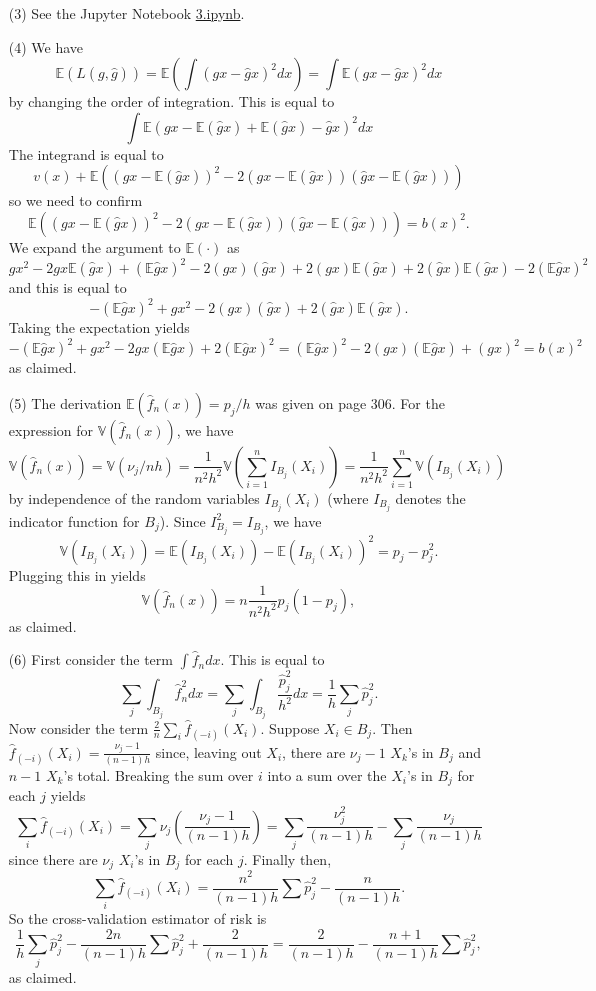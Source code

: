 \documentclass[10pt]{article}
\newcommand{\V}{\mathbb{V}}
\newcommand{\E}{\mathbb{E}}
\begin{document}
\begin{enumerate}
\item[(3)]
See the Jupyter Notebook
\href{https://github.com/ajrasmus/some_of_statistics/blob/main/chapter_20/3.ipynb}{3.ipynb}.

\item[(4)]
We have
\[
\E(L(g,\hat g)) = \E\left(\int (gx - \hat gx)^2dx\right) =
\int \E(gx - \hat gx)^2 dx
\]
by changing the order of integration. This is equal to
\[
\int \E(gx - \E(\hat gx) + \E(\hat gx) - \hat gx)^2 dx
\]
The integrand is equal to
\[
v(x) + \E((gx - \E(\hat gx))^2  - 2(gx-\E(\hat gx))(\hat gx - \E(\hat gx)))
\]
so we need to confirm
\[
\E((gx - \E(\hat gx))^2  - 2(gx-\E(\hat gx))(\hat gx - \E(\hat gx))) = b(x)^2.
\]
We expand the argument to $\E(\cdot)$ as
\[
gx^2 - 2gx\E(\hat gx) + (\E\hat gx)^2 - 2(gx)(\hat gx) + 2(gx)\E(\hat gx) +
2(\hat gx)\E(\hat gx) - 2 (\E\hat gx)^2
\]
and this is equal to
\[
- (\E \hat gx)^2 + gx^2 - 2(gx)(\hat gx) + 2(\hat gx)\E(\hat gx).
\]
Taking the expectation yields
\[
-(\E \hat gx)^2 + gx^2 - 2 gx(\E \hat gx) + 2(\E\hat gx)^2
= (\E \hat gx)^2 - 2(gx)(\E\hat gx) + (gx)^2 = b(x)^2
\]
as claimed.

\item[(5)]
The derivation $\E(\hat f_n(x))=p_j/h$ was given on page 306. For the expression for
$\V(\hat f_n(x))$, we have
\[
\V(\hat f_n(x))=\V(\nu_j/{nh})=\frac{1}{n^2h^2}\V\left(\sum_{i=1}^n I_{B_j}(X_i)\right)=
\frac{1}{n^2h^2}\sum_{i=1}^n \V(I_{B_j}(X_i))
\]
by independence of the random variables $I_{B_j}(X_i)$ (where $I_{B_j}$ denotes
the indicator function for $B_j$). Since $I_{B_j}^2 = I_{B_j}$, we have
\[
\V(I_{B_j}(X_i)) = \E(I_{B_j}(X_i)) - \E(I_{B_j}(X_i))^2 = p_j - p_j^2.
\]
Plugging this in yields
\[
\V(\hat f_n(x)) = n \frac{1}{n^2h^2} p_j(1-p_j),
\]
as claimed.

\item[(6)]
First consider the term $\int \hat f_n dx$. This is equal to
\[
\sum_j \int_{B_j} \hat f_n^2 dx = \sum_j \int_{B_j} \frac{\hat p_j^2}{h^2}dx
= \frac{1}{h} \sum_j \hat p_j^2.
\]
Now consider the term $\frac{2}{n}\sum_i \hat f_{(-i)}(X_i)$. Suppose
$X_i\in B_j$. Then $\hat f_{(-i)}(X_i)=\frac{\nu_j-1}{(n-1)h}$ since,
leaving out $X_i$, there are $\nu_j-1$ $X_k$'s in $B_j$ and $n-1$ $X_k$'s total.
Breaking the sum over $i$ into a sum over the $X_i$'s in $B_j$ for each $j$ yields
\[
\sum_i \hat f_{(-i)}(X_i) = \sum_j \nu_j \left(\frac{\nu_j-1}{(n-1)h}\right)
= \sum_j \frac{\nu_j^2}{(n-1)h} - \sum_j \frac{\nu_j}{(n-1)h}
\]
since there are $\nu_j$ $X_i$'s in $B_j$ for each $j$. Finally then,
\[
\sum_i \hat f_{(-i)}(X_i) = \frac{n^2}{(n-1)h} \sum \hat p_j^2 - \frac{n}{(n-1)h}.
\]
So the cross-validation estimator of risk is
\[
\frac{1}{h} \sum_j \hat p_j^2 - \frac{2n}{(n-1)h} \sum \hat p_j^2 + \frac{2}{(n-1)h}
= \frac{2}{(n-1)h} - \frac{n+1}{(n-1)h}\sum \hat p_j^2,
\]
as claimed.

\end{enumerate}
\end{document}
